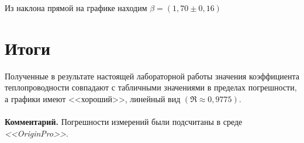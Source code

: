\documentclass[a4paper,12pt]{article} %
\begin{document}
Из наклона прямой на графике находим $ \beta=(1,70\pm 0,16) $
\section{Итоги}

Полученные в результате настоящей лабораторной
работы значения коэффициента теплопроводности совпадают с табличными
значениями в пределах погрешности, а графики имеют <<хороший>>, линейный 
вид $ (\mathfrak{R}\approx0,9775). $\\\\
\textbf{Комментарий. }Погрешности измерений были 
подсчитаны в среде \textit{<<OriginPro>>}.
\end{document}
